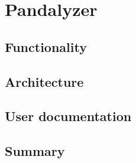 \chapter{Pandalyzer}

\section{Functionality}

\section{Architecture}

\section{User documentation}

\section*{Summary}
